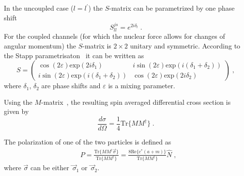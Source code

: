 In the uncoupled case ($l = l^{\prime}$) the $S$-matrix can be parametrized by one phase shift
\begin{equation}
S^{js}_{ll} = e^{2i\delta_{l}}\;.
\end{equation}
For the coupled channels (for which the nuclear force allows for changes of angular momentum) the $S$-matrix is $2\times 2$ unitary and symmetric. According to the Stapp parametrisaton~\cite{Stapp} it can be written as
\begin{equation}
S = 
\left(\begin{matrix} 
\cos (2\varepsilon) \mathrm{exp}(2i\delta_{1}) & i\sin (2\varepsilon) \mathrm{exp}(i(\delta_{1} + \delta_{2})) \\
i\sin (2\varepsilon) \mathrm{exp}(i(\delta_{1} + \delta_{2})) & \cos (2\varepsilon) \mathrm{exp}(2i\delta_{2})
\end{matrix}\right)\;,
\end{equation}
where $\delta_{1}$, $\delta_{2}$ are phase shifts and $\varepsilon$ is a mixing parameter.

Using the  $M$-matrix~\cite{glockle1983quantum}, the resulting spin averaged differential cross section is given by
\begin{equation}
\frac{d\sigma}{d\Omega} = \frac{1}{4}\mathrm{Tr}\lbrace MM^{\dagger}\rbrace\;.
\label{Eq2Ncross}
\end{equation}

The polarization of one of the two particles is defined as
\begin{equation}
\begin{split}
&P = \frac{\mathrm{Tr}\lbrace MM^{\dagger}\vec{\sigma}\rbrace}{\mathrm{Tr}\lbrace MM^{\dagger}\rbrace} = \frac{8\mathrm{Re}\lbrace c^{*}(a+m)\rbrace}{\mathrm{Tr}\lbrace MM^{\dagger}\rbrace}\hat{N}\;,
\end{split}
\label{Eq2Npola1}
\end{equation}
where $\vec{\sigma}$ can be either $\!\vec{\,\sigma}_{1}$ or $\!\vec{\,\sigma}_{2}$. 

